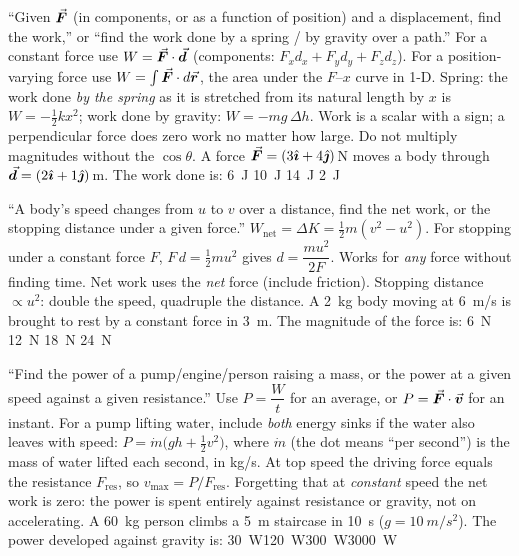 {``Given $\vec{\bm{F}}$ (in components, or as a function of position) and a displacement, find the work,'' or
``find the work done by a spring / by gravity over a path.''}
{For a constant force use $W=\vec{\bm{F}}\cdot\vec{\bm{d}}$ (components: $F_xd_x+F_yd_y+F_zd_z$). For a position-varying
force use $W=\int\vec{\bm{F}}\cdot d\vec{\bm{r}}$, the area under the $F$--$x$ curve in 1-D. Spring: the work done \emph{by the spring} as it is
stretched from its natural length by $x$ is $W=-\tfrac12 kx^2$; work done by gravity: $W=-mg\,\Delta h$.}
{Work is a scalar with a sign; a perpendicular force does zero work no matter how large. Do not multiply
magnitudes without the $\cos\theta$.}
{A force $\vec{\bm{F}}=(3\hat{\bm{\imath}}+4\hat{\bm{\jmath}})\,$N moves a body through
$\vec{\bm{d}}=(2\hat{\bm{\imath}}+1\hat{\bm{\jmath}})\,$m. The work done is:}
{\SI{6}{J}}
{\SI{10}{J}}
{\SI{14}{J}}
{\SI{2}{J}}

{``A body's speed changes from $u$ to $v$ over a distance, find the net work, or the stopping
distance under a given force.''}
{$W_{\text{net}}=\Delta K=\tfrac12 m(v^2-u^2)$. For stopping under a constant force $F$,
$F\,d=\tfrac12 mu^2$ gives $d=\dfrac{mu^2}{2F}$. Works for \emph{any} force without finding time.}
{Net work uses the \emph{net} force (include friction). Stopping distance $\propto u^2$: double the speed,
quadruple the distance.}
{A \SI{2}{kg} body moving at \SI{6}{m/s} is brought to rest by a constant force in \SI{3}{m}. The
magnitude of the force is:}
{\SI{6}{N}}
{\SI{12}{N}}
{\SI{18}{N}}
{\SI{24}{N}}

{``Find the power of a pump/engine/person raising a mass, or the power at a given speed against a given
resistance.''}
{Use $P=\dfrac{W}{t}$ for an average, or $P=\vec{\bm{F}}\cdot\vec{\bm{v}}$ for an instant. For a pump lifting water,
include \emph{both} energy sinks if the water also leaves with speed: $P=\dot m\big(gh+\tfrac12v^2\big)$,
where $\dot m$ (the dot means ``per second'') is the mass of water lifted each second, in \si{kg/s}.
At top speed the driving force equals the resistance $F_{\text{res}}$, so $v_{\max}=P/F_{\text{res}}$.}
{Forgetting that at \emph{constant} speed the net work is zero: the power is spent entirely against
resistance or gravity, not on accelerating.}
{A \SI{60}{kg} person climbs a \SI{5}{m} staircase in \SI{10}{s} ($g=\SI{10}{m/s^2}$). The power
developed against gravity is:}
{\SI{30}{W}}{\SI{120}{W}}{\SI{300}{W}}{\SI{3000}{W}}

